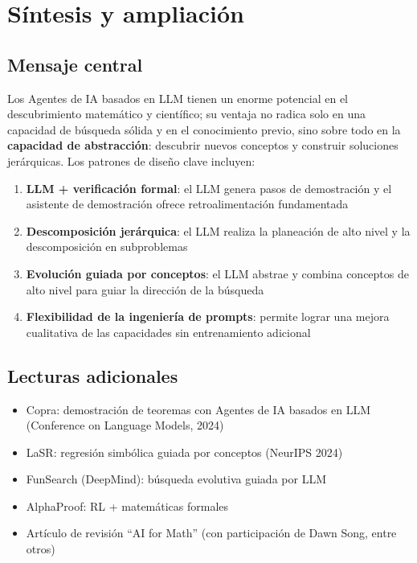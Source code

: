 \section{Síntesis y ampliación}

\subsection{Mensaje central}

Los Agentes de IA basados en LLM tienen un enorme potencial en el descubrimiento matemático y científico; su ventaja no radica solo en una capacidad de búsqueda sólida y en el conocimiento previo, sino sobre todo en la \textbf{capacidad de abstracción}: descubrir nuevos conceptos y construir soluciones jerárquicas. Los patrones de diseño clave incluyen:

\begin{enumerate}
    \item \textbf{LLM + verificación formal}: el LLM genera pasos de demostración y el asistente de demostración ofrece retroalimentación fundamentada
    \item \textbf{Descomposición jerárquica}: el LLM realiza la planeación de alto nivel y la descomposición en subproblemas
    \item \textbf{Evolución guiada por conceptos}: el LLM abstrae y combina conceptos de alto nivel para guiar la dirección de la búsqueda
    \item \textbf{Flexibilidad de la ingeniería de prompts}: permite lograr una mejora cualitativa de las capacidades sin entrenamiento adicional
\end{enumerate}

\subsection{Lecturas adicionales}
\begin{itemize}
    \item Copra: demostración de teoremas con Agentes de IA basados en LLM (Conference on Language Models, 2024)
    \item LaSR: regresión simbólica guiada por conceptos (NeurIPS 2024)
    \item FunSearch (DeepMind): búsqueda evolutiva guiada por LLM
    \item AlphaProof: RL + matemáticas formales
    \item Artículo de revisión ``AI for Math'' (con participación de Dawn Song, entre otros)
\end{itemize}



